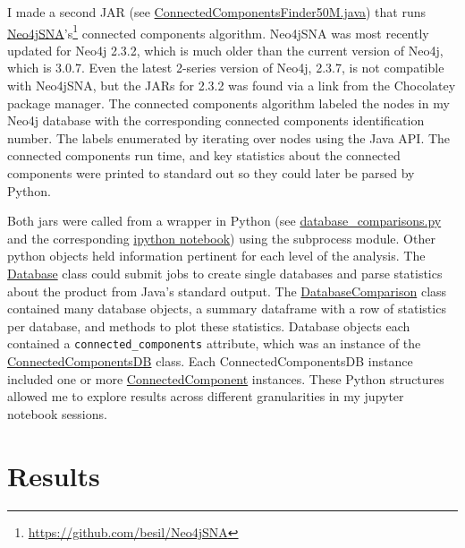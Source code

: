 \documentclass[12pt]{article}
\begin{document}
I made a second JAR (see \href{https://github.com/JanetMatsen/Neo4j_meta4/blob/master/data_mining_Neo4j_v2_3_2/src/ConnectedComponentsFinder50M.java}{ConnectedComponentsFinder50M.java}) that runs \href{https://github.com/besil/Neo4jSNA}{Neo4jSNA}'s\footnote{\url{https://github.com/besil/Neo4jSNA}} connected components algorithm.
Neo4jSNA was most recently updated for Neo4j 2.3.2, which is much older than the current version of Neo4j, which is 3.0.7. 
Even the latest 2-series version of Neo4j, 2.3.7, is not compatible with Neo4jSNA, but the JARs for 2.3.2 was found via a link from the Chocolatey package manager.
The connected components algorithm labeled the nodes in my Neo4j database with the corresponding connected components identification number.
The labels enumerated by iterating over nodes using the Java API.
The connected components run time, and key statistics about the connected components were printed to standard out so they could later be parsed by Python. 

Both jars were called from a wrapper in Python (see \href{https://github.com/JanetMatsen/Neo4j_meta4/blob/master/code/database_comparisons.py}{database\_comparisons.py} and the corresponding \href{https://github.com/JanetMatsen/Neo4j_meta4/blob/master/jupyter/build_graphs_and_find_connected_components_50M.ipynb}{ipython notebook}) using the subprocess module.
Other python objects held information pertinent for each level of the analysis.  
The \href{https://github.com/JanetMatsen/Neo4j_meta4/blob/master/code/database_comparisons.py}{Database} class could submit jobs to create single databases and parse statistics about the product from Java's standard output.
The \href{https://github.com/JanetMatsen/Neo4j_meta4/blob/master/code/database_comparisons.py}{DatabaseComparison} class contained many database objects, a summary dataframe with a row of statistics per database, and methods to plot these statistics.
Database objects each contained a \texttt{connected\_components} attribute, which was an instance of the \href{https://github.com/JanetMatsen/Neo4j_meta4/blob/master/code/connected_component.py}{ConnectedComponentsDB} class.
Each ConnectedComponentsDB instance included one or more \href{https://github.com/JanetMatsen/Neo4j_meta4/blob/master/code/connected_component.py}{ConnectedComponent} instances.
These Python structures allowed me to explore results across different granularities in my jupyter notebook sessions.

\section{Results}  
\end{document}
